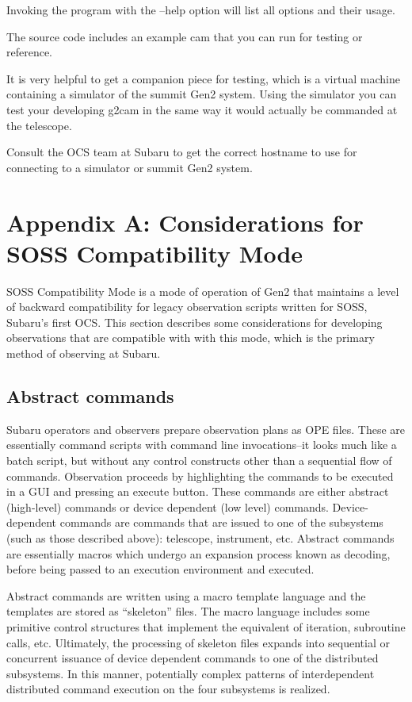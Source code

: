 \documentclass[11pt]{report}
\begin{document}
Invoking the program with the --help option will list all options and
their usage. 

The source code includes an example cam that you can run for testing or
reference.

It is very helpful to get a companion piece for testing, which is a
virtual machine containing a simulator of the summit Gen2 system.  Using
the simulator you can test your developing g2cam in the same way it
would actually be commanded at the telescope.

Consult the OCS team at Subaru to get the correct hostname to use for
connecting to a simulator or summit Gen2 system.

\chapter{Appendix A: Considerations for SOSS Compatibility Mode}
SOSS Compatibility Mode is a mode of operation of Gen2 that maintains a
level of backward compatibility for legacy observation scripts written
for SOSS, Subaru's first OCS. This section describes some considerations
for developing observations that are compatible with with this mode,
which is the primary method of observing at Subaru. 

\section{Abstract commands}
Subaru operators and observers prepare observation plans as OPE
files. These are essentially command scripts with command line
invocations--it looks much like a batch script, but without any control
constructs other than a sequential flow of commands. Observation
proceeds by highlighting the commands to be executed in a GUI and
pressing an execute button. These commands are either abstract
(high-level) commands or device dependent (low level)
commands. Device-dependent commands are commands that are issued to one
of the subsystems (such as those described above): telescope,
instrument, etc. Abstract commands are essentially macros which undergo
an expansion process known as decoding, before being passed to an
execution environment and executed.

Abstract commands are written using a macro template language and the
templates are stored as ``skeleton'' files. The macro language includes
some primitive control structures that implement the equivalent of
iteration, subroutine calls, etc. Ultimately, the processing of skeleton
files expands into sequential or concurrent issuance of device dependent
commands to one of the distributed subsystems. In this manner,
potentially complex patterns of interdependent distributed command
execution on the four subsystems is realized. 
\end{document}
